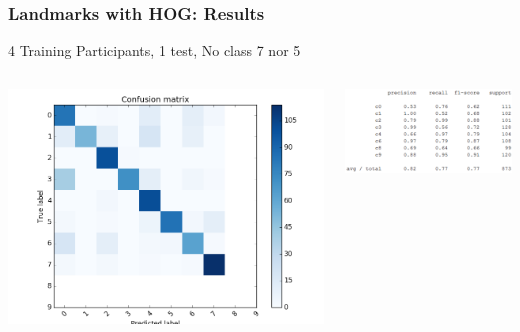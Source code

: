 \documentclass{beamer}
\begin{document}
	
	\begin{frame}
		\frametitle{Landmarks with HOG: Results}
		4 Training Participants, 1 test, No class 7 nor 5
		\begin{columns}
			\begin{column}{0.5\textwidth}
				\begin{center}
					\includegraphics[width=\textwidth]{mult_HOG/4c01234689matComparable}\\			
				\end{center}
			\end{column}
			\begin{column}{0.5\textwidth}
				\begin{center}
					\includegraphics[width=\textwidth]{mult_HOG/4c01234689repComparable}
				\end{center}
			\end{column}
		\end{columns}		
	\end{frame}	
	
\end{document}
